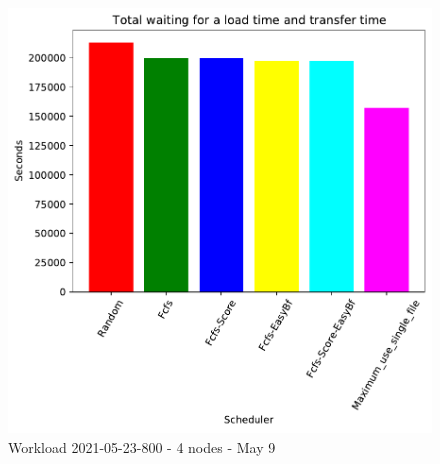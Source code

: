 \documentclass[a4paper]{article}
\begin{document}
\begin{figure}[H]
	\begin{minipage}[b]{0.5\linewidth}\centering\includegraphics[width=1\linewidth]{MBSS/plot/2021-05-23-800_Total_waiting_for_a_load_time_and_transfer_time4nodes.pdf}\caption{Waiting for a load + Transfer time}\vspace{4ex}\end{minipage}\caption{Workload 2021-05-23-800 - 4 nodes - May 9}\end{figure}
	
\end{document}
